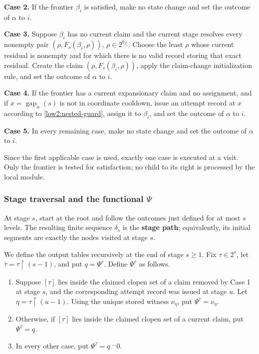 \documentclass[10pt,a4paper]{amsart}
\begin{document}
\medskip
\noindent\textbf{Case 2.}
If the frontier $\beta_i$ is satisfied, make no state change and set the
outcome of $\alpha$ to $i$.

\medskip
\noindent\textbf{Case 3.}
Suppose $\beta_i$ has no current claim and the current stage resolves every
nonempty pair
$(\rho,F_s(\beta_i,\rho))$, $\rho\in2^{k_{\beta_i}}$. Choose the least
$\rho$ whose current residual is nonempty and for which there is no valid
record storing that exact residual. Create the claim
$(\rho,F_s(\beta_i,\rho))$, apply the claim-change initialization rule, and
set the outcome of $\alpha$ to $i$.

\medskip
\noindent\textbf{Case 4.}
If the frontier has a current expansionary claim and no assignment, and if
$x=\operatorname{gap}_\alpha(s)$ is not in
coordinate cooldown, issue an attempt record at $x$ according to
\eqref{low2:nested-guard}, assign it to $\beta_i$, and set the outcome of
$\alpha$ to $i$.

\medskip
\noindent\textbf{Case 5.}
In every remaining case, make no state change and set the outcome of $\alpha$
to $i$.

\medskip
Since the first applicable case is used, exactly one case is executed at a
visit. Only the frontier is tested for satisfaction; no child to its right is
processed by the local module.

\subsubsection{Stage traversal and the functional $\Psi$}

At stage $s$, start at the root and follow the outcomes just defined for at
most $s$ levels. The resulting finite sequence $\delta_s$ is the
\textbf{stage path}; equivalently, its initial segments are exactly the nodes
visited at stage $s$.

We define the output tables recursively at the end of stage $s\geq1$. Fix
$\tau\in2^s$, let $\bar\tau=\tau\upharpoonright(s-1)$, and put
$q=\Psi^{\bar\tau}$. Define $\Psi^\tau$ as follows.
\begin{enumerate}[label=(\roman*)]
\item Suppose $[\tau]$ lies inside the claimed clopen set of a claim removed
      by Case 1 at stage $s$, and the corresponding attempt record was issued
      at stage $u$. Let $\eta=\tau\upharpoonright(u-1)$. Using the unique
      stored witness $\nu_\eta$, put $\Psi^\tau=\nu_\eta$.
\item Otherwise, if $[\tau]$ lies inside the claimed clopen set of a current
      claim, put $\Psi^\tau=q$.
\item In every other case, put $\Psi^\tau=q\,^{\smallfrown}0$.
\end{enumerate}
\end{document}
